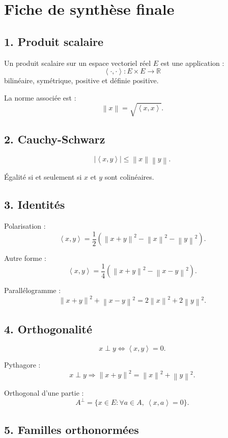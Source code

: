 \documentclass[11pt,a4paper]{article}
\newcommand{\R}{\mathbb R}
\newcommand{\norme}[1]{\left\lVert #1\right\rVert}
\newcommand{\scal}[2]{\left\langle #1,#2\right\rangle}
\begin{document}
\newpage
\section{Fiche de synthèse finale}

\subsection*{1. Produit scalaire}

Un produit scalaire sur un espace vectoriel réel \(E\) est une application :
\[
\scal{\cdot}{\cdot}:E\times E\to\R
\]
bilinéaire, symétrique, positive et définie positive.

La norme associée est :
\[
\norme{x}=\sqrt{\scal{x}{x}}.
\]

\subsection*{2. Cauchy-Schwarz}

\[
|\scal{x}{y}|\leq\norme{x}\norme{y}.
\]

Égalité si et seulement si \(x\) et \(y\) sont colinéaires.

\subsection*{3. Identités}

Polarisation :
\[
\scal{x}{y}
=
\frac12(\norme{x+y}^2-\norme{x}^2-\norme{y}^2).
\]

Autre forme :
\[
\scal{x}{y}
=
\frac14(\norme{x+y}^2-\norme{x-y}^2).
\]

Parallélogramme :
\[
\norme{x+y}^2+\norme{x-y}^2
=
2\norme{x}^2+2\norme{y}^2.
\]

\subsection*{4. Orthogonalité}

\[
x\perp y
\Longleftrightarrow
\scal{x}{y}=0.
\]

Pythagore :
\[
x\perp y
\Longrightarrow
\norme{x+y}^2=\norme{x}^2+\norme{y}^2.
\]

Orthogonal d'une partie :
\[
A^\perp=\{x\in E:\forall a\in A,\ \scal{x}{a}=0\}.
\]

\subsection*{5. Familles orthonormées}
\end{document}
